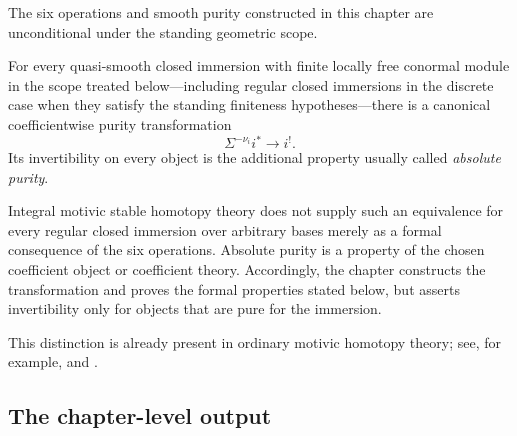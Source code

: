 \begin{remark}
\label{rem:six-absolute-purity-warning}
The six operations and smooth purity constructed in this chapter are
unconditional under the standing geometric scope.

For every quasi-smooth closed immersion with finite locally free conormal
module in the scope treated below---including regular closed immersions in
the discrete case when they satisfy the standing finiteness
hypotheses---there is a canonical coefficientwise purity transformation
\[
    \Sigma^{-\nu_i}i^*
    \longrightarrow
    i^!.
\]
Its invertibility on every object is the additional property usually called
\emph{absolute purity}.

Integral motivic stable homotopy theory does not supply such an equivalence
for every regular closed immersion over arbitrary bases merely as a formal
consequence of the six operations.  Absolute purity is a property of the
chosen coefficient object or coefficient theory.  Accordingly, the chapter
constructs the transformation and proves the formal properties stated
below, but asserts invertibility only for objects that are pure for the
immersion.

This distinction is already present in ordinary motivic homotopy theory;
see, for example, \cite{HoyoisSixOperations} and
\cite{DegliseJinKhanFundamentalClasses}.
\end{remark}

\subsection{The chapter-level output}


